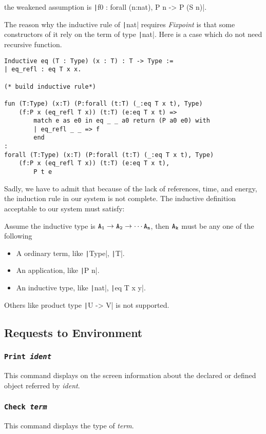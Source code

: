 the weakened assumption is \texttt|f0 : forall (n:nat), P n -> P (S n)|.\par
The reason why the inductive rule of \texttt|nat| requires {\it Fixpoint} is that some constructors of it
rely on the term of type \texttt|nat|. Here is a case which do not need recursive function.
\begin{center}
\begin{verbatim}
Inductive eq (T : Type) (x : T) : T -> Type :=
| eq_refl : eq T x x.

(* build inductive rule*)

fun (T:Type) (x:T) (P:forall (t:T) (_:eq T x t), Type) 
    (f:P x (eq_refl T x)) (t:T) (e:eq T x t) => 
        match e as e0 in eq _ _ a0 return (P a0 e0) with 
        | eq_refl _ _ => f
        end
: 
forall (T:Type) (x:T) (P:forall (t:T) (_:eq T x t), Type) 
    (f:P x (eq_refl T x)) (t:T) (e:eq T x t),
        P t e
\end{verbatim}
\end{center}
Sadly, we have to admit that because of the lack of references, time, and energy,
the induction rule in our system is not complete.
The inductive definition acceptable to our system must satisfy:\par
Assume the inductive type is $\tt A_1\to A_2\to \cdots A_n$, then $\tt A_k$ must be
any one of the following
\begin{itemize}
\item A ordinary term, like \texttt|Type|, \texttt|T|.
\item An application, like \texttt|P n|.
\item An inductive type, like \texttt|nat|, \texttt|eq T x y|.
\end{itemize}
Others like product type \texttt|U -> V| is not supported.

\subsection{Requests to Environment}
\subsubsection{\tt Print \sl ident}
This command displays on the screen information about the declared or defined object referred by {\sl ident}.
\subsubsection{\tt Check \sl term}
This command displays the type of {\sl term}.

